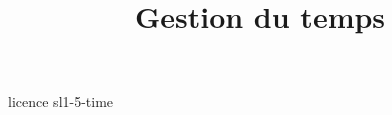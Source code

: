 \documentclass [xcolor=table] {beamer}
\title {Gestion du temps}
\begin{document}
 {licence}
 {sl1-5-time}
\end{document}
